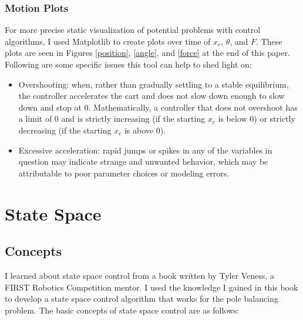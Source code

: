 \documentclass[12pt]{article}
\begin{document}
\subsubsection{Motion Plots}

For more precise static visualization of potential problems with control algorithms, I used Matplotlib \cite{matplotlib} to create plots over time of $x _c$, $\theta$, and $F$. These plots are seen in Figures \ref{position}, \ref{angle}, and \ref{force} at the end of this paper. Following are some specific issues this tool can help to shed light on:

\begin{itemize}
    \item Overshooting: when, rather than gradually settling to a stable equilibrium, the controller accelerates the cart and does not slow down enough to slow down and stop at 0. Mathematically, a controller that does not overshoot has a limit of 0 and is strictly increasing (if the starting $x _c$ is below 0) or strictly decreasing (if the starting $x _c$ is above 0).
    \item Excessive acceleration: rapid jumps or spikes in any of the variables in question may indicate strange and unwanted behavior, which may be attributable to poor parameter choices or modeling errors.
\end{itemize}

\section{State Space}

\subsection{Concepts}

I learned about state space control from a book \cite{veness} written by Tyler Veness, a FIRST Robotics Competition mentor. I used the knowledge I gained in this book to develop a state space control algorithm that works for the pole balancing problem. The basic concepts of state space control are as follows:
\end{document}
